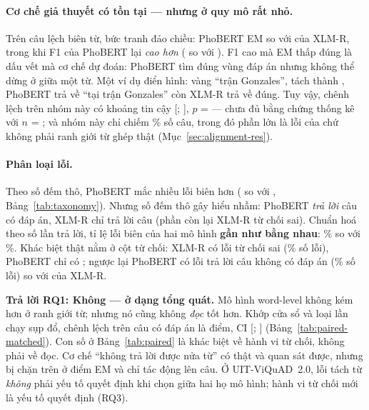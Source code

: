 \paragraph{Cơ chế giả thuyết có tồn tại --- nhưng ở quy mô rất nhỏ.} Trên \SegMis{} câu lệch biên từ,
bức tranh đảo chiều: PhoBERT EM \PhobertMisEM{} so với \XlmrMisEM{} của XLM-R, trong khi F1 của
PhoBERT lại \emph{cao hơn} (\PhobertMisFone{} so với \XlmrMisFone). F1 cao mà EM thấp đúng là dấu vết
mà cơ chế dự đoán: PhoBERT tìm đúng vùng đáp án nhưng không thể dừng ở giữa một từ. Một ví dụ điển
hình: vàng ``trận Gonzales'',  tách thành , PhoBERT trả về ``tại
trận Gonzales'' còn XLM-R trả về đúng. Tuy vậy, chênh lệch trên nhóm này có khoảng tin cậy
[\PairMisLo; \PairMisHi], $p$ = \PairMisP{} --- chưa đủ bằng chứng thống kê với $n$ = \PairMisN; và nhóm
này chỉ chiếm \SegMisPct\% số câu, trong đó phần lớn là lỗi của  chứ không phải ranh giới
từ ghép thật (Mục~\ref{sec:alignment-res}).

\paragraph{Phân loại lỗi.} Theo số đếm thô, PhoBERT mắc nhiều lỗi biên hơn (\PhobertErrBoundary{} so
với \XlmrErrBoundary{}, Bảng~\ref{tab:taxonomy}). Nhưng số đếm thô gây hiểu nhầm: PhoBERT \emph{trả lời}
\PhobertAnsweredAns{} câu có đáp án, XLM-R chỉ trả lời \XlmrAnsweredAns{} câu (phần còn lại XLM-R từ
chối sai). Chuẩn hoá theo số lần trả lời, tỉ lệ lỗi biên của hai mô hình \textbf{gần như bằng nhau}:
\PhobertBoundaryRate\% so với \XlmrBoundaryRate\%. Khác biệt thật nằm ở cột từ chối: XLM-R có
\XlmrErrFalseAbs{} lỗi từ chối sai (\XlmrErrFalseAbsPct\% số lỗi), PhoBERT chỉ có \PhobertErrFalseAbs;
ngược lại PhoBERT có \PhobertErrFalseAns{} lỗi trả lời câu không có đáp án (\PhobertErrFalseAnsPct\% số
lỗi) so với \XlmrErrFalseAns{} của XLM-R.

\begin{keybox}
\textbf{Trả lời RQ1: Không --- ở dạng tổng quát.} Mô hình word-level không kém hơn ở ranh giới từ; nhưng nó
cũng không \emph{đọc} tốt hơn. Khớp cửa sổ và loại lần chạy sụp đổ, chênh lệch trên câu có đáp án là
\PairMAnsDiff{} điểm, CI [\PairMAnsArtLo; \PairMAnsArtHi] (Bảng~\ref{tab:paired-matched}). Con số
\PairAnsDiff{} ở Bảng~\ref{tab:paired} là khác biệt về hành vi từ chối, không phải về đọc. Cơ chế ``không trả lời được nửa từ'' có thật và
quan sát được, nhưng bị chặn trên ở \SegCeilingLoss{} điểm EM và chỉ tác động lên \SegMis{} câu. Ở
UIT-ViQuAD~2.0, lỗi tách từ \emph{không} phải yếu tố quyết định khi chọn giữa hai họ mô hình; hành vi
từ chối mới là yếu tố quyết định (RQ3).
\end{keybox}


